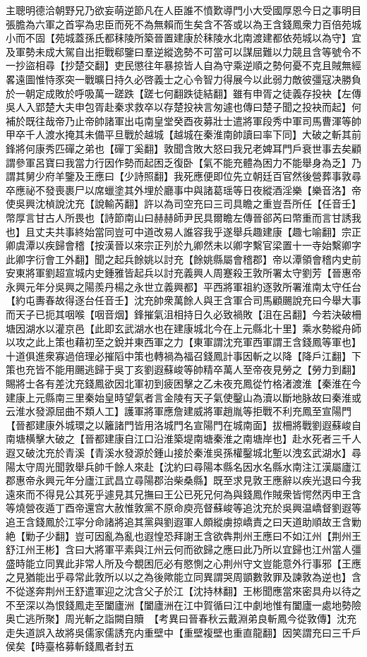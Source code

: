 主聰明德洽朝野兄乃欲妄萌逆節凡在人臣誰不憤歎導門小大受國厚恩今日之事明目張膽為六軍之首寜為忠臣而死不為無賴而生矣含不答或以為王含錢鳳衆力百倍苑城小而不固【苑城蓋孫氏都秣陵所築晉置建康於秣陵水北南渡建都依苑城以為守】宜及軍勢未成大駕自出拒戰郗鑒曰羣逆縱逸勢不可當可以謀屈難以力競且含等號令不一抄盜相尋【抄楚交翻】吏民懲往年暴掠皆人自為守乘逆順之勢何憂不克且賊無經畧遠圖惟恃豕突一戰曠日持久必啓義士之心令智力得展今以此弱力敵彼彊寇决勝負於一朝定成敗於呼吸萬一蹉跌【蹉七何翻跌徒結翻】雖有申胥之徒義存投袂【左傳吳人入郢楚大夫申包胥赴秦求救卒以存楚投袂言匆遽也傳曰楚子聞之投袂而起】何補於既往哉帝乃止帝帥諸軍出屯南皇堂癸酉夜募壯士遣將軍段秀中軍司馬曹渾等帥甲卒千人渡水掩其未備平旦戰於越城【越城在秦淮南帥讀曰率下同】大破之斬其前鋒將何康秀匹磾之弟也【磾丁奚翻】敦聞含敗大怒曰我兄老婢耳門戶衰世事去矣顧謂參軍呂寶曰我當力行因作勢而起困乏復卧【氣不能充體為困力不能舉身為乏】乃謂其舅少府羊鑒及王應曰【少詩照翻】我死應便即位先立朝廷百官然後營葬事敦尋卒應祕不發喪裹尸以席蠟塗其外埋於廳事中與諸葛瑶等日夜縱酒淫樂【樂音洛】帝使吳興沈楨說沈充【說輸芮翻】許以為司空充曰三司具瞻之重豈吾所任【任音壬】幣厚言甘古人所畏也【詩節南山曰赫赫師尹民具爾瞻左傳晉郤芮曰幣重而言甘誘我也】且丈夫共事終始當同豈可中道改易人誰容我乎遂舉兵趣建康【趣七喻翻】宗正卿虞潭以疾歸會稽【按漢晉以來宗正列於九卿然未以卿字繫官梁置十一寺始繫卿字此卿字衍會工外翻】聞之起兵餘姚以討充【餘姚縣屬會稽郡】帝以潭領會稽内史前安東將軍劉超宣城内史鍾雅皆起兵以討充義興人周蹇殺王敦所署太守劉芳【晉惠帝永興元年分吳興之陽羨丹楊之永世立義興都】平西將軍祖約逐敦所署淮南太守任台【約屯夀春故得逐台任音壬】沈充帥衆萬餘人與王含軍合司馬顧颺說充曰今舉大事而天子已扼其咽喉【咽音烟】鋒摧氣沮相持日久必致禍敗【沮在呂翻】今若決破柵塘因湖水以灌京邑【此即玄武湖水也在建康城北今在上元縣北十里】乘水勢縱舟師以攻之此上策也藉初至之銳并東西軍之力【東軍謂沈充軍西軍謂王含錢鳳等軍也】十道俱進衆寡過倍理必摧䧟中策也轉禍為福召錢鳳計事因斬之以降【降戶江翻】下策也充皆不能用颺逃歸于吳丁亥劉遐蘇峻等帥精卒萬人至帝夜見勞之【勞力到翻】賜將士各有差沈充錢鳳欲因北軍初到疲困擊之乙未夜充鳳從竹格渚渡淮【秦淮在今建康上元縣南三里秦始皇時望氣者言金陵有天子氣使鑿山為瀆以斷地脉故曰秦淮或云淮水發源屈曲不類人工】護軍將軍應詹建威將軍趙胤等拒戰不利充鳳至宣陽門【晉都建康外城環之以籬諸門皆用洛城門名宣陽門在城南面】拔柵將戰劉遐蘇峻自南塘横擊大破之【晉都建康自江口沿淮築堤南塘秦淮之南塘岸也】赴水死者三千人遐又破沈充於青溪【青溪水發源於鍾山接於秦淮吳孫權鑿城北塹以洩玄武湖水】尋陽太守周光聞敦舉兵帥千餘人來赴【沈約曰尋陽本縣名因水名縣水南注江漢屬廬江郡惠帝永興元年分廬江武昌立尋陽郡治柴桑縣】既至求見敦王應辭以疾光退曰今我遠來而不得見公其死乎遽見其兄撫曰王公已死兄何為與錢鳳作賊衆皆愕然丙申王含等燒營夜遁丁酉帝還宫大赦惟敦黨不原命庾亮督蘇峻等追沈充於吳興温嶠督劉遐等追王含錢鳳於江寜分命諸將追其黨與劉遐軍人頗縱虜掠嶠責之曰天道助順故王含勦絶【勦子少翻】豈可因亂為亂也遐惶恐拜謝王含欲犇荆州王應曰不如江州【荆州王舒江州王彬】含曰大將軍平素與江州云何而欲歸之應曰此乃所以宜歸也江州當人彊盛時能立同異此非常人所及今覩困厄必有愍惻之心荆州守文豈能意外行事邪【王應之見猶能出乎尋常此敦所以以之為後歟能立同異謂哭周顗數敦罪及諫敦為逆也】含不從遂奔荆州王舒遣軍迎之沈含父子於江【沈持林翻】王彬聞應當來密具舟以待之不至深以為恨錢鳳走至闔廬洲【闔廬洲在江中賀循曰江中劇地惟有闔廬一處地勢險奥亡逃所聚】周光斬之詣闕自贖　【考異曰晉春秋云戴淵弟良斬鳳今從敦傳】沈充走失道誤入故將吳儒家儒誘充内重壁中【重壁複壁也重直龍翻】因笑謂充曰三千戶侯矣【時臺格募斬錢鳳者封五